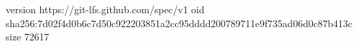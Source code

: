 version https://git-lfs.github.com/spec/v1
oid sha256:7d02f4d0b6c7d50c922203851a2cc95dddd200789711e9f735ad06d0c87b413c
size 72617
